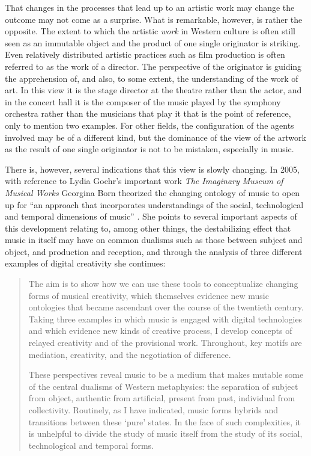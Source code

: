 \documentclass[11pt]{article}
\begin{document}
That changes in the processes that lead up to an artistic work may
change the outcome may not come as a surprise. What is remarkable,
however, is rather the opposite. The extent to which the artistic
\emph{work} in Western culture is often still seen as an immutable
object and the product of one single originator is striking. Even
relatively distributed artistic practices such as film production is
often referred to as the work of a director. The perspective of the
originator is guiding the apprehension of, and also, to some extent,
the understanding of the work of art. In this view it is the stage 
director at the theatre rather than the actor, and in the concert hall it is the composer of the music played by
the symphony orchestra rather than the musicians that play it that is
the point of reference, only to mention two examples. For other fields, the configuration of the
agents involved may be of a different kind, but the dominance of the
view of the artwork as the result of one single originator is not to
be mistaken, especially in music.

There is, however, several indications that this view is slowly
changing. In 2005, with reference to Lydia Goehr's important work
\emph{The Imaginary Museum of Musical Works} Georgina Born theorized
the changing ontology of music to open up for ``an approach that
incorporates understandings of the social, technological and temporal
dimensions of music'' \citep[p. 8]{Born2005}. She points to several
important aspects of this development relating to, among other things,
the destabilizing effect that music in itself may have on common
dualisms such as those between
subject and object, and production and reception, and through the
analysis of three different examples of digital creativity she continues:
\begin{quote}
  The aim is to show how we can use these tools to conceptualize
  changing forms of musical creativity, which themselves evidence new
  music ontologies that became ascendant over the course of the
  twentieth century. Taking three examples in which music is engaged
  with digital technologies and which evidence new kinds of creative
  process, I develop concepts of relayed creativity and of the
  provisional work. Throughout, key motifs are mediation, creativity,
  and the negotiation of difference.

  These perspectives reveal music to be a medium that makes mutable
some of the central dualisms of Western metaphysics: the separation of subject from object,
authentic from artificial, present from past, individual from collectivity. Routinely, as I have
indicated, music forms hybrids and transitions between these ‘pure’ states. In the face of such
complexities, it is unhelpful to divide the study of music itself from the study of its social,
technological and temporal forms.
  \citep[p. 8]{Born2005}
\end{quote}
\end{document}
